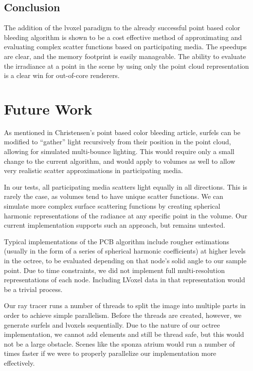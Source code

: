 \documentclass[runningheads]{llncs}
\begin{document}
\subsection{Conclusion}

The addition of the lvoxel paradigm to the already successful point based color bleeding algorithm is shown to be a cost effective method of approximating and evaluating complex scatter functions based on participating media.  The speedups are clear, and the memory footprint is easily manageable.  The ability to evaluate the irradiance at a point in the scene by using only the point cloud representation is a clear win for out-of-core renderers.

\section{Future Work}


As mentioned in Christensen's point based color bleeding article, surfels can be modified to ``gather'' light recursively from their position in the point cloud, allowing for simulated multi-bounce lighting.  This would require only a small change to the current algorithm, and would apply to volumes as well to allow very realistic scatter approximations in participating media.

In our tests, all participating media scatters light equally in all directions.  This is rarely the case, as volumes tend to have unique scatter functions.  We can simulate more complex surface scattering functions by creating spherical harmonic representations of the radiance at any specific point in the volume.  Our current implementation supports such an approach, but remains untested.

Typical implementations of the PCB algorithm include rougher estimations (usually in the form of a series of spherical harmonic coefficients) at higher levels in the octree, to be evaluated depending on that node's solid angle to our sample point.  Due to time constraints, we did not implement full multi-resolution representations of each node.  Including LVoxel data in that representation would be a trivial process.

Our ray tracer runs a number of threads to split the image into multiple parts  in order to achieve simple parallelism.  Before the threads are created, however, we generate surfels and lvoxels sequentially.  Due to the nature of our octree implementation, we cannot add elements and still be thread safe, but this would not be a large obstacle.  Scenes like the sponza atrium would run a number of times faster if we were to properly parallelize our implementation more effectively.
\end{document}
